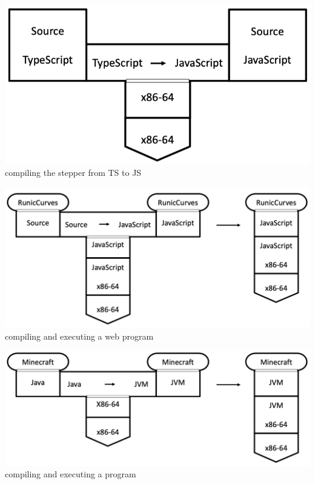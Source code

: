 \documentclass[10pt, landscape]{article}
\begin{document}
\begin{multicols}{4}
\begin{center}
    \includegraphics[width=\linewidth]{compiling stepper.png}
compiling the stepper from TS to JS
\end{center}


\begin{center}
    \includegraphics[width=\linewidth]{compiling and executing web program.png}
compiling and executing a web program
\end{center}

\begin{center}
    \includegraphics[width=\linewidth]{compiling and executing program.png}
compiling and executing a program
\end{center}

\end{multicols}
\end{document}
